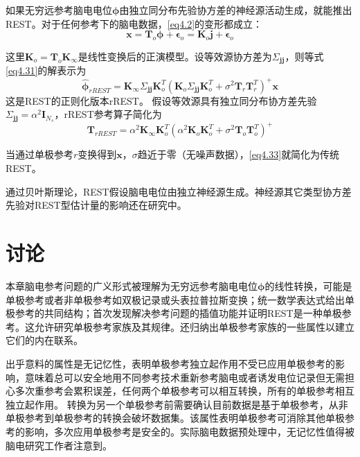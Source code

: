 如果无穷远参考脑电电位$\mathbf{\phi}$由独立同分布先验协方差的神经源活动生成，就能推出REST。对于任何参考下的脑电数据，\eqref{eq4.2}的变形都成立：
\begin{equation}\label{eq4.31}
\mathbf{x}=\mathbf{T}_o\mathbf{\phi}+\mathbf{\epsilon}_o=\mathbf{K}_o\mathbf{j}+\mathbf{\epsilon}_o
\end{equation}

这里$\mathbf{K}_o=\mathbf{T}_o\mathbf{K}_{\infty}$是线性变换后的正演模型。设等效源协方差为$\Sigma_{\mathbf{jj}}$，则等式\eqref{eq4.31}的解表示为
\begin{equation}\label{eq4.32}
\hat{\mathbf{\phi}}_{rREST}=\mathbf{K}_{\infty}\Sigma_{\mathbf{jj}}\mathbf{K}_o^T(\mathbf{K}_o\Sigma_{\mathbf{jj}}\mathbf{K}_o^T+\sigma^2\mathbf{T}_r\mathbf{T}_r^T)^+\mathbf{x}
\end{equation}
这是REST的正则化版本rREST。 假设等效源具有独立同分布协方差先验$\Sigma_\mathbf{jj}=\alpha^2\mathbf{I}_{N_s}$，rREST参考算子简化为
\begin{equation}\label{eq4.33}
\mathbf{T}_{rREST}=\alpha^2\mathbf{K}_{\infty}\mathbf{K}_o^T(\alpha^2\mathbf{K}_o\mathbf{K}_o^T+\sigma^2\mathbf{T}_o\mathbf{T}_o^T)^+
\end{equation}

当通过单极参考$r$变换得到$\mathbf{x}$，$\sigma$趋近于零（无噪声数据），\eqref{eq4.33}就简化为传统REST。

通过贝叶斯理论，REST假设脑电电位由独立神经源生成。神经源其它类型协方差先验对REST型估计量的影响还在研究中。 
\section{讨论}
本章脑电参考问题的广义形式被理解为无穷远参考脑电电位$\mathbf{\phi}$的线性转换，可能是单极参考或者非单极参考如双极记录或头表拉普拉斯变换；统一数学表达式给出单极参考的共同结构；首次发现解决参考问题的插值功能并证明REST是一种单极参考。这允许研究单极参考家族及其规律。还归纳出单极参考家族的一些属性以建立它们的内在联系。

出乎意料的属性是无记忆性，表明单极参考独立起作用不受已应用单极参考的影响，意味着总可以安全地用不同参考技术重新参考脑电或者诱发电位记录但无需担心多次重参考会累积误差，任何两个单极参考可以相互转换，所有的单极参考相互独立起作用。 转换为另一个单极参考前需要确认目前数据是基于单极参考，从非单极参考到单极参考的转换会破坏数据集。该属性表明单极参考可消除其他单极参考的影响，多次应用单极参考是安全的。实际脑电数据预处理中，无记忆性值得被脑电研究工作者注意到。

